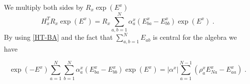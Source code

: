 \documentclass[10pt]{article}
\numberwithin{equation}{section}
\numberwithin{equation}{subsection}
\newcommand{\dt}{\;.}
\begin{document}
We multiply both sides by $R_{x}\exp{(E^{x})}$
\begin{equation}\label{intermediateTransposeSite}
    H_{x}^{T}R_{x}\exp{(E^{x})}=R_{x}\sum_{a,b =1}^{N}\alpha_{a}^{x}\left(E_{b a}^{x}-E_{bb}^{x}\right)\exp{(E^{x})}\dt
\end{equation}
By using \eqref{HT-BA} and the fact that 
$\sum_{a,b=1}^{N}E_{ab}$ is central for the algebra we have 
\begin{comment}
then, in the right hand side
\begin{equation}\label{intermediateTransposeSite}
H_{x}^{T}R_{x}\exp{(E^{x})}=R_{x}\exp{(E^{x})}\exp{(-E^{x})}\sum_{a,b=1}^{N}\alpha_{a}^{x}\left(E_{b a}^{x}-E_{bb}^{x}\right)\exp{(E^{x})}
\end{equation}
\end{comment}
 \begin{comment}
 \eqref{HT_El1}, \eqref{HT_Ell},\eqref{HT-E1l}, \eqref{HT-Ekl}, \eqref{HT-E11} we have that 
\begin{align}
    &\exp{(-E^{x})}\sum_{a=1}^{N}\sum_{b=1}^{N}\alpha_{a}^{x}\left(E_{b a}^{x}-E_{bb}^{x}\right)\exp{(E^{x})}\nonumber
    \\&=\nonumber
    \sum_{a=2}^{N}\alpha_{a}^{x}\left(E_{Na}^{x}+E_{NN}^{x}-\sum_{c=1}^{N-1}(E_{cN}^{x})-\sum_{c=1}^{N-1}(E_{ca}^{x})-E_{NN}^{x}+
    \sum_{c=2}^{N}(E_{cN}^{x})\right)
    \\&+\nonumber
    \alpha_{N}^{x}\sum_{b=1}^{N-1}\left(E_{bN}^{x}-E_{bb}^{x}-E_{bN}^{x}\right)+\sum_{a=1}^{N-1}\sum_{b=1}^{N-1}\alpha_{a}^{x}\left(E_{ba}^{x}+E_{bN}^{x}-E_{bb}^{x}-E_{bN}^{x}\right)
    \\&=\nonumber
    \sum_{a=1}^{N-1}\alpha_{a}^{x}E_{Na}^{x}-|\alpha^{x}|\sum_{b=1}^{N-1}E_{bb}^{x}=
    \sum_{a=1}^{N-1}\left(\alpha_{a}^{x}E_{Na}^{x}-|\alpha^{x}|E_{aa}^{x}\right)
    \\&=\nonumber
    |\alpha^{x}|\sum_{a=1}^{N-1}\left(\frac{\alpha_{a}^{x}}{|\alpha^{x}|}E_{Na}^{x}-E_{aa}^{x}\right)
    \\&=
    |\alpha^{x}|\sum_{a=1}^{N-1}\left(\rho_{a}^{x}E_{Na}^{x}-E_{aa}^{x}\right)
 \end{align}
in short
\end{comment}
\begin{equation}\label{HadTransfBoundary}
\exp{(-E^{x})}\sum_{a=1}^{N}\sum_{b=1}^{N}\alpha_{a}^{x}\left(E_{b a}^{x}-E_{bb}^{x}\right)\exp{(E^{x})}=	|\alpha^{x}|\sum_{a=1}^{N-1}\left(\rho_{a}^{x}E_{Na}^{x}-E_{aa}^{x}\right)\dt
\end{equation}
\end{document}

